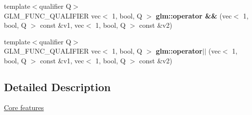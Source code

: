 \begin{DoxyCompactItemize}
\item 
{\footnotesize template$<$qualifier Q$>$ }\\G\+L\+M\+\_\+\+F\+U\+N\+C\+\_\+\+Q\+U\+A\+L\+I\+F\+I\+ER vec$<$ 1, bool, Q $>$ {\bfseries glm\+::operator \&\&} (vec$<$ 1, bool, Q $>$ const \&v1, vec$<$ 1, bool, Q $>$ const \&v2)
\item 
{\footnotesize template$<$qualifier Q$>$ }\\G\+L\+M\+\_\+\+F\+U\+N\+C\+\_\+\+Q\+U\+A\+L\+I\+F\+I\+ER vec$<$ 1, bool, Q $>$ {\bfseries glm\+::operator$\vert$$\vert$} (vec$<$ 1, bool, Q $>$ const \&v1, vec$<$ 1, bool, Q $>$ const \&v2)
\end{DoxyCompactItemize}


\subsection{Detailed Description}
\hyperlink{group__core}{Core features} 